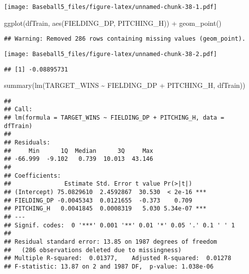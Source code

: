\documentclass[
]{article}
\newenvironment{Shaded}{\begin{snugshade}}{\end{snugshade}}
\newcommand{\FunctionTok}[1]{\textcolor[rgb]{0.00,0.00,0.00}{#1}}
\newcommand{\NormalTok}[1]{#1}
\newcommand{\SpecialCharTok}[1]{\textcolor[rgb]{0.00,0.00,0.00}{#1}}
\begin{document}
\texttt{[image: Baseball5\_files/figure-latex/unnamed-chunk-38-1.pdf]}

\begin{Shaded}
\begin{Highlighting}[]
\FunctionTok{ggplot}\NormalTok{(dfTrain, }\FunctionTok{aes}\NormalTok{(FIELDING\_DP, PITCHING\_H)) }\SpecialCharTok{+}
  \FunctionTok{geom\_point}\NormalTok{()}
\end{Highlighting}
\end{Shaded}

\begin{verbatim}
## Warning: Removed 286 rows containing missing values (geom_point).
\end{verbatim}

\texttt{[image: Baseball5\_files/figure-latex/unnamed-chunk-38-2.pdf]}

\begin{Shaded}
\end{Shaded}

\begin{verbatim}
## [1] -0.08895731
\end{verbatim}

\begin{Shaded}
\begin{Highlighting}[]
\FunctionTok{summary}\NormalTok{(}\FunctionTok{lm}\NormalTok{(TARGET\_WINS }\SpecialCharTok{\textasciitilde{}}\NormalTok{ FIELDING\_DP }\SpecialCharTok{+}\NormalTok{ PITCHING\_H, dfTrain))}
\end{Highlighting}
\end{Shaded}

\begin{verbatim}
## 
## Call:
## lm(formula = TARGET_WINS ~ FIELDING_DP + PITCHING_H, data = dfTrain)
## 
## Residuals:
##     Min      1Q  Median      3Q     Max 
## -66.999  -9.102   0.739  10.013  43.146 
## 
## Coefficients:
##               Estimate Std. Error t value Pr(>|t|)    
## (Intercept) 75.0829610  2.4592867  30.530  < 2e-16 ***
## FIELDING_DP -0.0045343  0.0121655  -0.373    0.709    
## PITCHING_H   0.0041845  0.0008319   5.030 5.34e-07 ***
## ---
## Signif. codes:  0 '***' 0.001 '**' 0.01 '*' 0.05 '.' 0.1 ' ' 1
## 
## Residual standard error: 13.85 on 1987 degrees of freedom
##   (286 observations deleted due to missingness)
## Multiple R-squared:  0.01377,    Adjusted R-squared:  0.01278 
## F-statistic: 13.87 on 2 and 1987 DF,  p-value: 1.038e-06
\end{verbatim}
\end{document}
